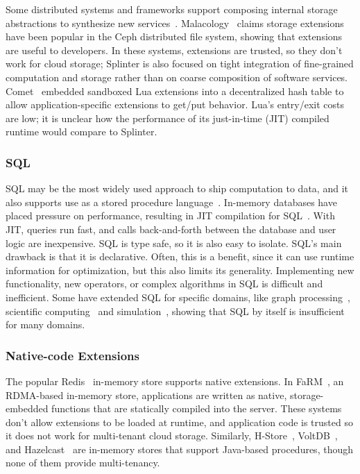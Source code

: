 Some distributed systems and frameworks support composing internal storage
abstractions to synthesize new
services~\cite{corfu,tango,istore,sdds,boxwood,malacology}.
Malacology~\cite{malacology} claims storage extensions have been popular
in the Ceph distributed file system, showing that extensions are useful to
developers. In these systems, extensions are trusted, so they don't work for
cloud storage; Splinter is also focused on tight integration of fine-grained
computation and storage rather than on coarse composition of software services.
Comet~\cite{comet} embedded sandboxed Lua extensions into a decentralized hash
table to allow application-specific extensions to get/put behavior.
Lua's entry/exit costs are low; it is unclear how the performance of its
just-in-time (JIT) compiled runtime would compare to Splinter.

\subsubsection{SQL}
%
SQL may be the most widely used approach to ship computation to data,
and it also supports use as a stored procedure language~\cite{tsql,plsql}.
In-memory databases
have placed pressure on performance, resulting
in JIT compilation for SQL~\cite{hekaton-compile,hyper-llvm}. With JIT,
queries run fast, and calls
back-and-forth between the database and user logic are inexpensive. SQL is type
safe, so it is also easy to isolate. SQL's main
drawback is that it is declarative. Often, this is a benefit,
since it can use runtime information for optimization, but this also
limits its generality. Implementing new
functionality, new operators, or complex algorithms in SQL is difficult and
inefficient.
%
Some have extended SQL for specific domains, like graph
processing~\cite{neo4j}, scientific computing~\cite{gmm,scidb} and
simulation~\cite{simsql}, showing that SQL by itself is insufficient for many domains.

\subsubsection{Native-code Extensions}
%
The popular
Redis~\cite{redis} in-memory store supports native extensions. In
FaRM~\cite{farm-2014,farm-txns}, an RDMA-based in-memory store, applications are written as
native, storage-embedded functions that are statically compiled into the
server.  These systems don't allow extensions to be loaded at runtime, and
application code is trusted so it does not work for multi-tenant cloud storage.
Similarly, H-Store~\cite{hstore}, VoltDB~\cite{voltdb}, and
Hazelcast~\cite{hazelcast} are in-memory stores that support Java-based
procedures, though none of them provide multi-tenancy.

